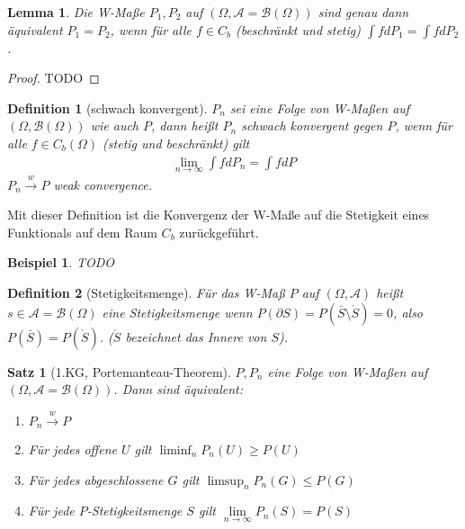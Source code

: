 \documentclass[]{article}
\newtheorem{theorem}{Satz}
\newtheorem{lemma}{Lemma}
\newtheorem{definition}{Definition}
\newtheorem*{example}{Beispiel}
\begin{document}
\begin{lemma}
	Die W-Maße $P_1, P_2$ auf $(\Omega, \mathcal{A}=\mathcal{B}(\Omega))$ sind genau dann äquivalent $P_1 = P_2$, wenn für alle $f\in C_b$ (beschränkt und stetig) $\int f dP_1 = \int f dP_2$.
\end{lemma}

\begin{proof}
	TODO
\end{proof}

\begin{definition}[schwach konvergent]
	$P_n$ sei eine Folge von W-Maßen auf $(\Omega, \mathcal{B}(\Omega))$ wie auch $P$, dann heißt $P_n$ schwach konvergent gegen $P$, wenn für alle $f\in C_b(\Omega)$ (stetig und beschränkt) gilt
	\begin{align*}
		\lim\limits_{n\rightarrow\infty} \int f dP_n = \int f dP
	\end{align*}
	$P_n\xrightarrow{w} P$ weak convergence.
\end{definition}

Mit dieser Definition ist die Konvergenz der W-Maße auf die Stetigkeit eines Funktionals auf dem Raum $C_b$ zurückgeführt.

\begin{example}
	TODO
\end{example}

\begin{definition}[Stetigkeitsmenge]
	Für das W-Maß $P$ auf $(\Omega, \mathcal{A})$ heißt $s\in\mathcal{A} = \mathcal{B}(\Omega)$ eine Stetigkeitsmenge wenn $P(\partial S) = P(\bar{S}\setminus\mathring{S}) = 0$, also $P(\bar{S}) = P(\mathring{S})$. ($\mathring{S}$ bezeichnet das Innere von $S$).
\end{definition}

\begin{theorem}[1.KG, Portemanteau-Theorem]
	$P, P_n$ eine Folge von W-Maßen auf $(\Omega, \mathcal{A}=\mathcal{B}(\Omega))$. Dann sind äquivalent:
	\begin{enumerate}
		\item $P_n \xrightarrow{w}P$
		\item Für jedes offene $U$ gilt $\liminf_n P_n(U) \geq P(U)$
		\item Für jedes abgeschlossene $G$ gilt $\limsup_n P_n(G) \leq P(G)$
		\item Für jede $P$-Stetigkeitsmenge $S$ gilt $\lim\limits_{n\rightarrow\infty} P_n(S) = P(S)$
	\end{enumerate}
\end{theorem}
\end{document}

